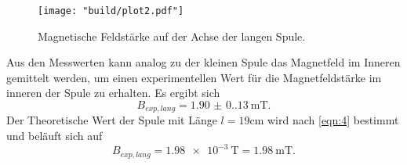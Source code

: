 \begin{figure}
    \caption{Magnetische Feldstärke auf der Achse der langen Spule.}
    \label{fig:1}
    \centering
    \texttt{[image: "build/plot2.pdf"]}
\end{figure}
\noindent Aus den Messwerten kann analog zu der kleinen Spule das Magnetfeld
im Inneren gemittelt werden, um einen experimentellen Wert für die 
Magnetfeldstärke im inneren der Spule zu erhalten. Es ergibt sich
\begin{equation*}
    B_{exp,lang} = \qty{1.90(0.13)}{\milli\tesla}.
\end{equation*}
Der Theoretische Wert der Spule mit Länge $l = 19\unit{\centi\meter}$ wird
nach \autoref{eqn:4} bestimmt und beläuft sich auf
\begin{equation*}
    B_{exp,lang} = \qty{1.98e-3}{\tesla} = \qty{1.98}{\milli\tesla}.
\end{equation*}

